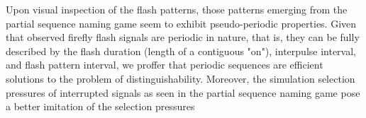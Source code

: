 
Upon visual inspection of the flash patterns, those patterns emerging from the partial sequence naming game seem to exhibit pseudo-periodic properties. 
Given that observed firefly flash signals are periodic in nature, that is, they can be fully described by the flash duration (length of a contiguous "on"), interpulse interval, and flash pattern interval, we proffer that periodic sequences are efficient solutions to the problem of distinguishability.
Moreover, the simulation selection pressures of interrupted signals as seen in the partial sequence naming game pose a better imitation of the selection pressures 
 
